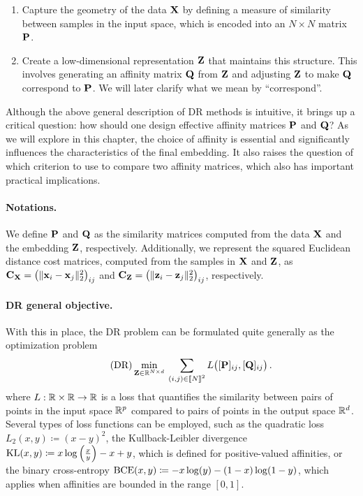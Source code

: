 \begin{enumerate}
    \item Capture the geometry of the data ${\mathbf{X}}$ by defining a measure of similarity between samples in the input space, which is encoded into an $N \times N$ matrix ${\mathbf{P}}$.
    \item Create a low-dimensional representation ${\mathbf{Z}}$ that maintains this structure. This involves generating an affinity matrix ${\mathbf{Q}}$ from ${\mathbf{Z}}$ and adjusting ${\mathbf{Z}}$ to make ${\mathbf{Q}}$ correspond to ${\mathbf{P}}$. We will later clarify what we mean by ``correspond''.
\end{enumerate}

Although the above general description of DR methods is intuitive, it brings up a critical question: how should one design effective affinity matrices ${\mathbf{P}}$ and ${\mathbf{Q}}$? As we will explore in this chapter, the choice of affinity is essential and significantly influences the characteristics of the final embedding. It also raises the question of which criterion to use to compare two affinity matrices, which also has important practical implications.

\paragraph{Notations.} 
We define ${\mathbf{P}}$ and ${\mathbf{Q}}$ as the similarity matrices computed from the data ${\mathbf{X}}$ and the embedding ${\mathbf{Z}}$, respectively. Additionally, we represent the squared Euclidean distance cost matrices, computed from the samples in ${\mathbf{X}}$ and ${\mathbf{Z}}$, as $\mathbf{C}_{\mathbf{X}} = \left(\|{\mathbf{x}}_{i}-{\mathbf{x}}_{j}\|_2^2\right)_{ij}$ and $\mathbf{C}_{\mathbf{Z}} = \left(\|{\mathbf{z}}_{i}-{\mathbf{z}}_{j}\|_2^2\right)_{ij}$, respectively.

\paragraph{DR general objective.} With this in place, the DR problem can be formulated quite generally as the optimization problem
\begin{equation}
\label{eq:DR_criterion}\tag{DR}
\min_{{\mathbf{Z}} \in \mathbb{R}^{N \times d}} \: \sum_{(i,j) \in {[\![N]\!]}^2}  L\big([{\mathbf{P}}]_{ij}, [{\mathbf{Q}}]_{ij}\big) \,.
\end{equation}
where $L:\mathbb{R} \times \mathbb{R} \rightarrow \mathbb{R}$ is a loss that quantifies the similarity between pairs of points in the input space $\mathbb{R}^{p}$ compared to pairs of points in the output space $\mathbb{R}^{d}$. Several types of loss functions can be employed, such as the quadratic loss $L_2(x, y) \coloneqq (x - y)^2$, the Kullback-Leibler divergence $\operatorname{KL}(x, y) \coloneqq x \log \left(\frac{x}{y}\right) - x + y$, which is defined for positive-valued affinities, or the binary cross-entropy $\operatorname{BCE}(x, y) \coloneqq -x \log(y) - (1 - x) \log(1 - y)$, which applies when affinities are bounded in the range $[0,1]$.

